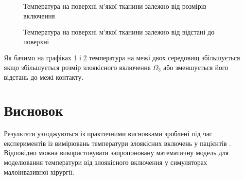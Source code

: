 \begin{figure}[ht!]
    \centering
    \caption{Температура на поверхні м'якої тканини залежно від розмірів включення}
    \label{fig:thermo_2d_solution_border_temp_size}
\end{figure}

\begin{figure}[ht!]
    \centering
    \caption{Температура на поверхні м'якої тканини залежно від відстані до поверхні}
    \label{fig:thermo_2d_solution_border_temp_depth}
\end{figure}

Як бачимо на графіках \ref{fig:thermo_2d_solution_border_temp_size} і \ref{fig:thermo_2d_solution_border_temp_depth}
температура на межі двох середовищ збільшується якщо збільшується розмір злоякісного включення $\Omega_3$ або 
зменшується його відстань до межі контакту.





\section{Висновок}

Результати узгоджуються із практичними висновками зроблені під час експериментів із вимірювань температури злоякісних 
включень у пацієнтів \cite{temperature-difference-in-tumor-and-tissue}. Відповідно можна використовувати запропоновану 
математичну модель для моделювання температури від злоякісного включення у симуляторах малоінвазивної хірургії.
